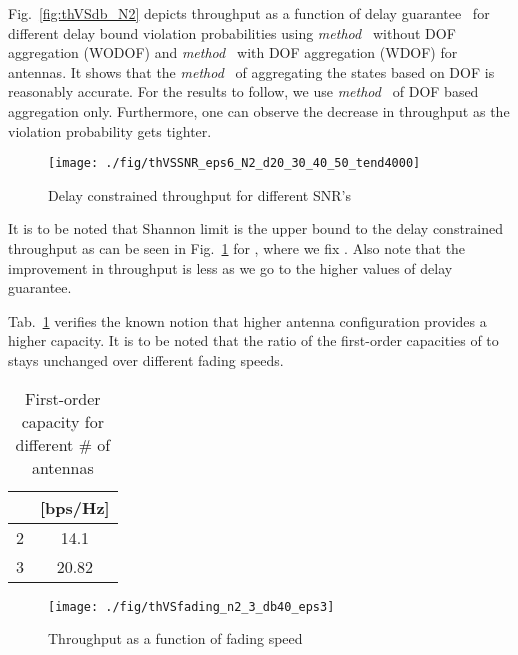 \documentclass[10pt,conference]{IEEEtran}
\begin{document}
Fig.~\ref{fig:thVSdb_N2} depicts throughput as a function of delay guarantee~ for different delay bound violation probabilities  using \emph{method~} without DOF aggregation (WODOF) and \emph{method~} with DOF aggregation (WDOF) for  antennas.
It shows that the \emph{method~} of aggregating the states based on DOF is reasonably accurate.
For the results to follow, we use \emph{method~} of DOF based aggregation only.
Furthermore, one can observe the decrease in throughput as the violation probability gets tighter.
\begin{figure}[t]
	\centering		 \texttt{[image: ./fig/thVSSNR\_eps6\_N2\_d20\_30\_40\_50\_tend4000]}
	\caption{Delay constrained throughput for different SNR's}
	\label{fig:thVSSNR_N2}
\end{figure}


It is to be noted that Shannon limit is the upper bound to the delay constrained throughput as can be seen in Fig.~\ref{fig:thVSSNR_N2} for , where we fix . Also note that the improvement in throughput is less as we go to the higher values of delay guarantee.


Tab.~\ref{tab:fading_meancap} verifies the known notion that higher antenna configuration provides a higher capacity.
It is to be noted that the ratio of the first-order capacities  of  to  stays unchanged over different fading speeds.
\begin{table}[tb]
\begin{center}
\caption{First-order capacity for different \# of antennas}
\label{tab:fading_meancap}
\begin{tabular}{|c||c|} \hline
 &  [bps/Hz] \\ \hline
2 & 14.1 \\ \hline
3 & 20.82 \\ \hline
\end{tabular}
\end{center}
\end{table}
\begin{figure}[t]
	\centering		 \texttt{[image: ./fig/thVSfading\_n2\_3\_db40\_eps3]}
	\caption{Throughput as a function of fading speed}
	\label{fig:thVSfad}
\end{figure}
\end{document}
